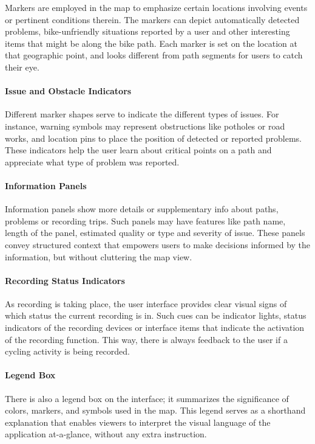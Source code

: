 Markers are employed in the map to emphasize certain locations involving events or pertinent conditions therein.
The markers can depict automatically detected problems, bike-unfriendly situations reported by a user and other interesting items that might be along the bike path.
Each marker is set on the location at that geographic point, and looks different from path segments for users to catch their eye.

\paragraph{Issue and Obstacle Indicators}

Different marker shapes serve to indicate the different types of issues.
For instance, warning symbols may represent obstructions like potholes or road works, and location pins to place the position of detected or reported problems.
These indicators help the user learn about critical points on a path and appreciate what type of problem was reported.

\paragraph{Information Panels}

Information panels show more details or supplementary info about paths, problems or recording trips.
Such panels may have features like path name, length of the panel, estimated quality or type and severity of issue.
These panels convey structured context that empowers users to make decisions informed by the information, but without cluttering the map view.

\paragraph{Recording Status Indicators}

As recording is taking place, the user interface provides clear visual signs of which status the current recording is in.
Such cues can be indicator lights, status indicators of the recording devices or interface items that indicate the activation of the recording function.
This way, there is always feedback to the user if a cycling activity is being recorded.

\paragraph{Legend Box}

There is also a legend box on the interface; it summarizes the significance of colors, markers, and symbols used in the map.
This legend serves as a shorthand explanation that enables viewers to interpret the visual language of the application at-a-glance, without any extra instruction.

